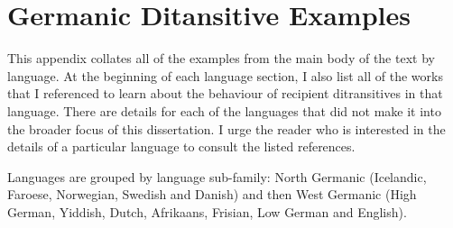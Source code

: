 \chapter{Germanic Ditansitive Examples}
This appendix collates all of the examples from the main body of the text by language. At the beginning of each language section, I also list all of the works that I referenced to learn about the behaviour of recipient ditransitives in that language. There are details for each of the languages that did not make it into the broader focus of this dissertation. I urge the reader who is interested in the details of a particular language to consult the listed references.

Languages are grouped by language sub-family: North Germanic (Icelandic, Faroese, Norwegian, Swedish and Danish) and then West Germanic (High German, Yiddish, Dutch, Afrikaans, Frisian, Low German and English).


